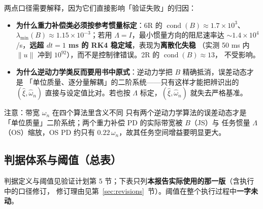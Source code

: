 \documentclass[11pt,a4paper]{ctexart}
\begin{document}
两点口径需要解释，因为它们直接影响「验证失败」的归因：

\begin{itemize}[leftmargin=1.6em,itemsep=3pt]
\item \textbf{为什么重力补偿类必须按参考惯量标定}：6R 的 $\operatorname{cond}(B)\approx1.7\times10^{3}$、
  $\lambda_{\min}(B)\approx1.15\times10^{-3}$；若用 $\Lambda=I$，最小惯量方向的阻尼速率达
  $\sim1.4\times10^{4}$/s，\textbf{远超 $dt=1$ ms 的 RK4 稳定域}，表现为\textbf{离散化失稳}
  （实测 50 ms 内 $\|u\|$ 冲到 $10^{92}$），而不是控制律错误。2R 的 $\operatorname{cond}(B)\approx13$，
  不受影响。
\item \textbf{为什么逆动力学类反而要用书中原式}：逆动力学把 $B$ 精确抵消，误差动态才是
  「单位质量、逐分量解耦」的二阶系统——只有这样才能把辨识出的 $(\hat\xi,\hat\omega_n)$
  直接与设定值比对。若也按 $\Lambda$ 标定，$(\hat\xi,\hat\omega_n)$ 就失去严格基准。
\end{itemize}

\begin{keybox}{注意：带宽 $\omega_n$ 在四个算法里含义不同}
只有两个逆动力学算法的误差动态才是「单位质量」二阶系统；两个重力补偿 PD 的实际带宽被 $B$（JS）与
任务惯量 $\Lambda$（OS）缩放，OS PD 约只有 $0.22\,\omega_n$，故其任务空间增益要明显更大。
\end{keybox}

\subsection{判据体系与阈值（总表）}

判据定义与阈值见验证计划第 5 节；下表只列\textbf{本报告实际使用的那一版}（含执行中的口径修订，
修订理由见第~\ref{sec:revisions}~节）。阈值在整个执行过程中\textbf{一字未动}。
\end{document}
